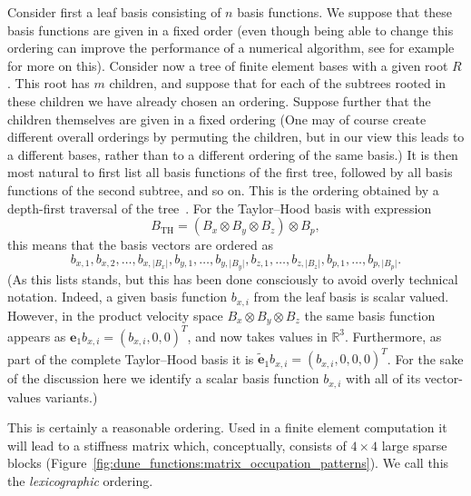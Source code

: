 \documentclass[a4paper,10pt,headings=normal,bibliography=totoc]{scrartcl}
\newcommand{\R}{\mathbb{R}}
\newcommand{\abs}[1]{{\lvert#1\rvert}}
\begin{document}
Consider first a leaf basis consisting of $n$ basis functions.  We suppose that these basis functions are given in a fixed
order (even though being able to change this ordering can improve the performance of a numerical
algorithm, see for example \cite{space_filling_curves,ordering_for_gauss_seidel} for more on this).
Consider now a tree of finite element bases with a given root $R$.  This root has $m$ children, and suppose that for
each of the subtrees rooted in these children we have already chosen an ordering.  Suppose further that the children themselves are given
in a fixed ordering (One may of course create different overall orderings by permuting the children, but in our view
this leads to a different bases, rather than to a different ordering of the same basis.)  It is then most natural
to first list all basis functions of the first tree, followed by all basis functions of the second subtree,
and so on.  This is the ordering obtained by a depth-first traversal of the tree~\cite{cormen:1990}.
For the Taylor--Hood basis with expression
\begin{equation*}
 B_\text{TH}
 =
 (B_x \otimes B_y \otimes B_z) \otimes B_p,
\end{equation*}
this means that the basis vectors are ordered as
\begin{equation*}
 b_{x,1}, b_{x,2}, \dots, b_{x,\abs{B_x}},
 b_{y,1}, \dots, b_{y,\abs{B_y}},
 b_{z,1}, \dots, b_{z,\abs{B_z}},
 b_{p,1}, \dots, b_{p,\abs{B_p}}.
\end{equation*}
(As this lists stands, but this has been done consciously to avoid overly technical notation.  Indeed, a given basis
function $b_{x,i}$ from the leaf basis is scalar valued.  However, in the product velocity space
$B_x \otimes B_y \otimes B_z$ the same basis function appears as $\mathbf{e}_1 b_{x,i} = (b_{x,i},0,0)^T$,
and now takes values in $\R^3$.  Furthermore, as part of the complete Taylor--Hood basis it is
$\tilde{\mathbf{e}}_1 b_{x,i} = (b_{x,i},0,0,0)^T$.  For the sake of the discussion here we identify a scalar
basis function $b_{x,i}$ with all of its vector-values variants.)

This is certainly a reasonable ordering.  Used in a finite element computation it will lead to a stiffness
matrix which, conceptually, consists of $4 \times 4$ large sparse blocks (Figure~\ref{fig:dune_functions:matrix_occupation_patterns}).
We call this the {\em lexicographic} ordering.
\end{document}
